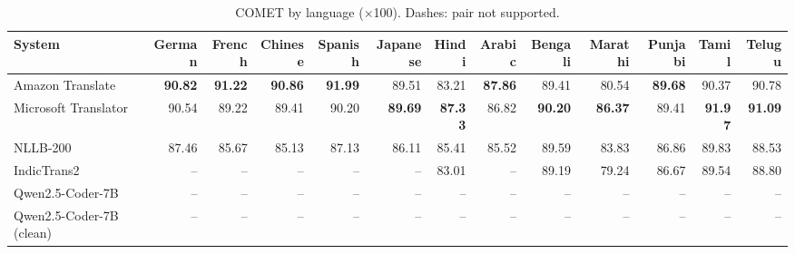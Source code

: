 \begin{table}[t]
\centering
\caption{COMET by language ($\times$100). Dashes: pair not supported.\label{tab:comet_lang}}
\begin{tabular}{lrrrrrrrrrrrr}
\toprule
System & German & French & Chinese & Spanish & Japanese & Hindi & Arabic & Bengali & Marathi & Punjabi & Tamil & Telugu \\
\midrule
Amazon Translate & \textbf{90.82} & \textbf{91.22} & \textbf{90.86} & \textbf{91.99} & 89.51 & 83.21 & \textbf{87.86} & 89.41 & 80.54 & \textbf{89.68} & 90.37 & 90.78 \\
Microsoft Translator & 90.54 & 89.22 & 89.41 & 90.20 & \textbf{89.69} & \textbf{87.33} & 86.82 & \textbf{90.20} & \textbf{86.37} & 89.41 & \textbf{91.97} & \textbf{91.09} \\
NLLB-200 & 87.46 & 85.67 & 85.13 & 87.13 & 86.11 & 85.41 & 85.52 & 89.59 & 83.83 & 86.86 & 89.83 & 88.53 \\
IndicTrans2 & -- & -- & -- & -- & -- & 83.01 & -- & 89.19 & 79.24 & 86.67 & 89.54 & 88.80 \\
Qwen2.5-Coder-7B & -- & -- & -- & -- & -- & -- & -- & -- & -- & -- & -- & -- \\
Qwen2.5-Coder-7B (clean) & -- & -- & -- & -- & -- & -- & -- & -- & -- & -- & -- & -- \\
\bottomrule
\end{tabular}
\end{table}
